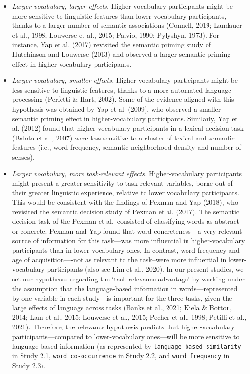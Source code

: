\documentclass[
  12pt,
  man,floatsintext]{apa7}
\begin{document}
\begin{itemize}
\item
  \emph{Larger vocabulary, larger effects.} Higher-vocabulary participants might be more sensitive to linguistic features than lower-vocabulary participants, thanks to a larger number of semantic associations (Connell, 2019; Landauer et al., 1998; Louwerse et al., 2015; Paivio, 1990; Pylyshyn, 1973). For instance, Yap et al. (2017) revisited the semantic priming study of Hutchinson and Louwerse (2013) and observed a larger semantic priming effect in higher-vocabulary participants.
\item
  \emph{Larger vocabulary, smaller effects.} Higher-vocabulary participants might be less sensitive to linguistic features, thanks to a more automated language processing (Perfetti \& Hart, 2002). Some of the evidence aligned with this hypothesis was obtained by Yap et al. (2009), who observed a smaller semantic priming effect in higher-vocabulary participants. Similarly, Yap et al. (2012) found that higher-vocabulary participants in a lexical decision task (Balota et al., 2007) were less sensitive to a cluster of lexical and semantic features (i.e., word frequency, semantic neighborhood density and number of senses).
\item
  \emph{Larger vocabulary, more task-relevant effects.} Higher-vocabulary participants might present a greater sensitivity to task-relevant variables, borne out of their greater linguistic experience, relative to lower vocabulary participants. This would be consistent with the findings of Pexman and Yap (2018), who revisited the semantic decision study of Pexman et al. (2017). The semantic decision task of the Pexman et al.~consisted of classifying words as abstract or concrete. Pexman and Yap found that word concreteness---a very relevant source of information for this task---was more influential in higher-vocabulary participants than in lower-vocabulary ones. In contrast, word frequency and age of acquisition----not as relevant to the task--were more influential in lower-vocabulary participants (also see Lim et al., 2020). In our present studies, we set our hypotheses regarding the `task-relevance advantage' by working under the assumption that the language-based information in words---represented by one variable in each study---is important for the three tasks, given the large effects of language across tasks (Banks et al., 2021; Kiela \& Bottou, 2014; Lam et al., 2015; Louwerse et al., 2015; Pecher et al., 1998; Petilli et al., 2021). Therefore, the relevance hypothesis predicts that higher-vocabulary participants---compared to lower-vocabulary ones---will be more sensitive to language-based information (as represented by \texttt{language-based\ similarity} in Study 2.1, \texttt{word\ co-occurrence} in Study 2.2, and \texttt{word\ frequency} in Study 2.3).
\end{itemize}
\end{document}
